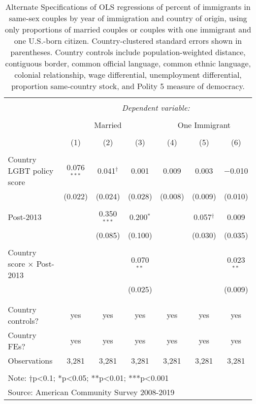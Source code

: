 \documentclass[
  11pt,
]{article}
\begin{document}
\begin{table}[!htbp] \centering 
  \caption{Alternate Specifications of OLS regressions of percent of immigrants in same-sex couples by year of immigration and country of origin, using only proportions of married couples or couples with one immigrant and one U.S.-born citizen. Country-clustered standard errors shown in parentheses. Country controls include population-weighted distance, contiguous border, common official language, common ethnic language, colonial relationship, wage differential, unemployment differential, proportion same-country stock, and Polity 5 measure of democracy.} 
  \label{tab:country-props-alt} 
\begin{tabular}{@{\extracolsep{5pt}}lcccccc} 
\\[-1.8ex]\hline 
\hline \\[-1.8ex] 
 & \multicolumn{6}{c}{\textit{Dependent variable:}} \\ 
\cline{2-7} 
\\[-1.8ex] & \multicolumn{3}{c}{Married} & \multicolumn{3}{c}{One Immigrant} \\ 
\\[-1.8ex] & (1) & (2) & (3) & (4) & (5) & (6)\\ 
\hline \\[-1.8ex] 
 Country LGBT policy score & 0.076$^{***}$ & 0.041$^{†}$ & 0.001 & 0.009 & 0.003 & $-$0.010 \\ 
  & (0.022) & (0.024) & (0.028) & (0.008) & (0.009) & (0.010) \\ 
  & & & & & & \\ 
 Post-2013 &  & 0.350$^{***}$ & 0.200$^{*}$ &  & 0.057$^{†}$ & 0.009 \\ 
  &  & (0.085) & (0.100) &  & (0.030) & (0.035) \\ 
  & & & & & & \\ 
 Country score × Post-2013 &  &  & 0.070$^{**}$ &  &  & 0.023$^{**}$ \\ 
  &  &  & (0.025) &  &  & (0.009) \\ 
  & & & & & & \\ 
\hline \\[-1.8ex] 
Country controls? & yes & yes & yes & yes & yes & yes \\ 
Country FEs? & yes & yes & yes & yes & yes & yes \\ 
Observations & 3,281 & 3,281 & 3,281 & 3,281 & 3,281 & 3,281 \\ 
\hline 
\hline \\[-1.8ex] 
\multicolumn{7}{l}{Note: †p<0.1; *p<0.05; **p<0.01; ***p<0.001} \\ 
\multicolumn{7}{l}{Source: American Community Survey 2008-2019} \\ 
\end{tabular} 
\end{table}
\end{document}
